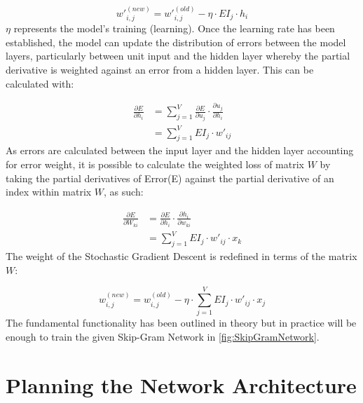 \begin{equation}
    w'^{(new)}_{i,j} = w'^{(old)}_{i,j} - \eta \cdot EI_{j} \cdot h_{i}
\end{equation}
$\eta$ represents the model's training (learning). Once the learning rate has been established, the model can update the distribution of errors between the model layers, particularly between unit input and the hidden layer whereby the partial derivative is weighted against an error from a hidden layer. This can be calculated with:

\begin{equation}
    \begin{split}
        \frac{\partial E}{\partial h_{i}} & = \sum_{j=1}^{V} \frac{\partial E}{\partial u_{j}} \cdot \frac{\partial u_{j}}{\partial h_{i}} \\
                                          & = \sum_{j=1}^{V} EI_{j} \cdot w'_{ij}
    \end{split}
\end{equation}
As errors are calculated between the input layer and the hidden layer accounting for error weight, it is possible to calculate the weighted loss of matrix $W$ by taking the partial derivatives of Error(E) against the partial derivative of an index within matrix $W$, as such:

\begin{equation} \label{}
    \begin{split}
        \frac{\partial E}{\partial W_{ki}} & = \frac{\partial E}{\partial h_{i}} \cdot \frac{\partial h_{i}}{\partial w_{ki}} \\
                                           & = \sum_{j=1}^{V} EI_{j} \cdot w'_{ij} \cdot x_{k}
    \end{split}
\end{equation}
The weight of the Stochastic Gradient Descent is redefined in terms of the matrix $W$:


\begin{equation}
    w^{(new)}_{i,j} = w^{(old)}_{i,j} - \eta \cdot \sum_{j=1}^{V} EI_{j} \cdot w'_{ij} \cdot x_{j}
\end{equation}
The fundamental functionality has been outlined in theory but in practice will be enough to train the given Skip-Gram Network in \autoref{fig:SkipGramNetwork}.

\section{Planning the Network Architecture}

